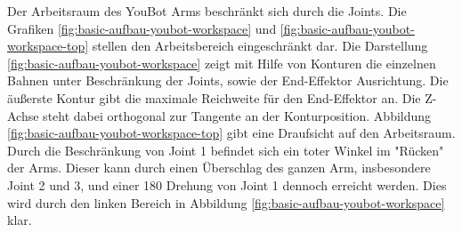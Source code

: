    Der Arbeitsraum des YouBot Arms beschränkt sich durch die Joints. Die Grafiken \ref{fig:basic-aufbau-youbot-workspace} und \ref{fig:basic-aufbau-youbot-workspace-top} stellen den Arbeitsbereich eingeschränkt dar. Die Darstellung \ref{fig:basic-aufbau-youbot-workspace} zeigt mit Hilfe von Konturen die einzelnen Bahnen unter Beschränkung der Joints, sowie der End-Effektor Ausrichtung.  Die äußerste Kontur gibt die maximale Reichweite für den End-Effektor an. Die Z-Achse steht dabei orthogonal zur Tangente an der Konturposition. Abbildung \ref{fig:basic-aufbau-youbot-workspace-top} gibt eine Draufsicht auf den Arbeitsraum. Durch die Beschränkung von Joint 1 befindet sich ein toter Winkel im "Rücken" der Arms. Dieser kann durch einen Überschlag des ganzen Arm, insbesondere Joint 2 und 3, und einer 180 \textdegree Drehung von Joint 1 dennoch erreicht werden. Dies wird durch den linken Bereich in Abbildung \ref{fig:basic-aufbau-youbot-workspace} klar.
   
